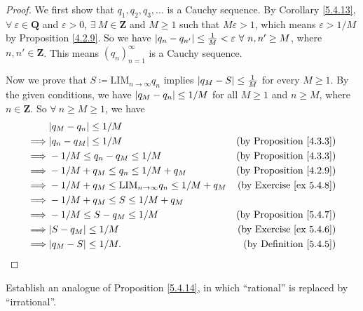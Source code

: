 \begin{proof}
    We first show that \(q_1, q_2, q_3, \dots\) is a Cauchy sequence.
    By Corollary \ref{5.4.13}, \(\forall\ \varepsilon \in \mathbf{Q}\) and \(\varepsilon > 0\), \(\exists\ M \in \mathbf{Z}\) and \(M \geq 1\) such that \(M\varepsilon > 1\), which means \(\varepsilon > 1 / M\) by Proposition \ref{4.2.9}.
    So we have \(\abs*{q_n - q_{n'}} \leq \frac{1}{M} < \varepsilon \ \forall\ n, n' \geq M\), where \(n, n' \in \mathbf{Z}\).
    This means \((q_n)_{n = 1}^{\infty}\) is a Cauchy sequence.

    Now we prove that \(S \coloneqq \text{LIM}_{n \to \infty} q_n\) implies \(\abs*{q_M - S} \leq \frac{1}{M}\) for every \(M \geq 1\).
    By the given conditions, we have \(\abs*{q_M - q_n} \leq 1 / M\) for all \(M \geq 1\) and \(n \geq M\), where \(n \in \mathbf{Z}\).
    So \(\forall\ n \geq M \geq 1\), we have
    \begin{align*}
                 & \abs*{q_M - q_n} \leq 1 / M                                                                            \\
        \implies & \abs*{q_n - q_M} \leq 1 / M                                      & \text{(by Proposition \ref{4.3.3})} \\
        \implies & -1 / M \leq q_n - q_M \leq 1 / M                                 & \text{(by Proposition \ref{4.3.3})} \\
        \implies & -1 / M + q_M \leq q_n \leq 1 / M + q_M                           & \text{(by Proposition \ref{4.2.9})} \\
        \implies & -1 / M + q_M \leq \text{LIM}_{n \to \infty} q_n \leq 1 / M + q_M & \text{(by Exercise \ref{ex 5.4.8})} \\
        \implies & -1 / M + q_M \leq S \leq 1 / M + q_M                                                                   \\
        \implies & -1 / M \leq S - q_M \leq 1 / M                                   & \text{(by Proposition \ref{5.4.7})} \\
        \implies & \abs*{S - q_M} \leq 1 / M                                        & \text{(by Exercise \ref{ex 5.4.6})} \\
        \implies & \abs*{q_M - S} \leq 1 / M.                                       & \text{(by Definition \ref{5.4.5})}
    \end{align*}
\end{proof}

\begin{exercise}\label{ex 5.5.5}
    Establish an analogue of Proposition \ref{5.4.14}, in which ``rational'' is replaced by ``irrational''.
\end{exercise}

